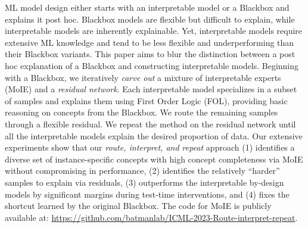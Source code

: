



ML model design either starts with an interpretable model or a Blackbox and explains it post hoc. Blackbox models are flexible but difficult to explain, while interpretable models are inherently explainable. Yet, interpretable models require extensive ML knowledge and tend to be less flexible and underperforming than their Blackbox variants. This paper aims to blur the distinction between a post hoc explanation of a Blackbox and constructing interpretable models. 
Beginning with a Blackbox, we iteratively \emph{carve out} a mixture of interpretable experts (MoIE) and a \emph{residual network}. Each interpretable model specializes in a subset of samples and explains them using First Order Logic (FOL), providing basic reasoning on concepts from the Blackbox. We route the remaining samples through a flexible residual. We repeat the method on the residual network until all the interpretable models explain the desired proportion of data. Our extensive experiments show that our \emph{route, interpret, and repeat} approach (1) identifies a diverse set of instance-specific concepts with high concept completeness via MoIE without compromising in performance, (2) identifies the relatively ``harder'' samples to explain via residuals, (3) outperforms the interpretable by-design models by significant margins during test-time interventions, and (4) fixes the shortcut learned by the original Blackbox. The code for MoIE is
publicly available at: \url{https://github.com/batmanlab/ICML-2023-Route-interpret-repeat}.